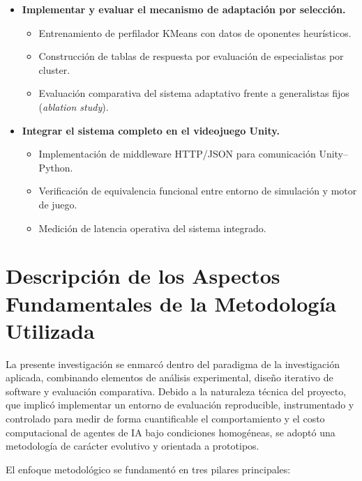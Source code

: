 \begin{itemize}
    \item \textbf{Implementar y evaluar el mecanismo de adaptación por selección.}
    \begin{itemize}
        \item Entrenamiento de perfilador KMeans con datos de oponentes heurísticos.
        \item Construcción de tablas de respuesta por evaluación de especialistas por cluster.
        \item Evaluación comparativa del sistema adaptativo frente a generalistas fijos (\textit{ablation study}).
    \end{itemize}

    \item \textbf{Integrar el sistema completo en el videojuego Unity.}
    \begin{itemize}
        \item Implementación de middleware HTTP/JSON para comunicación Unity--Python.
        \item Verificación de equivalencia funcional entre entorno de simulación y motor de juego.
        \item Medición de latencia operativa del sistema integrado.
    \end{itemize}

\end{itemize}

\section{Descripción de los Aspectos Fundamentales de la Metodología Utilizada}

La presente investigación se enmarcó dentro del paradigma de la investigación aplicada, combinando elementos de análisis experimental, diseño iterativo de software y evaluación comparativa. Debido a la naturaleza técnica del proyecto, que implicó implementar un entorno de evaluación reproducible, instrumentado y controlado para medir de forma cuantificable el comportamiento y el costo computacional de agentes de IA bajo condiciones homogéneas, se adoptó una metodología de carácter evolutivo y orientada a prototipos.

El enfoque metodológico se fundamentó en tres pilares principales:


